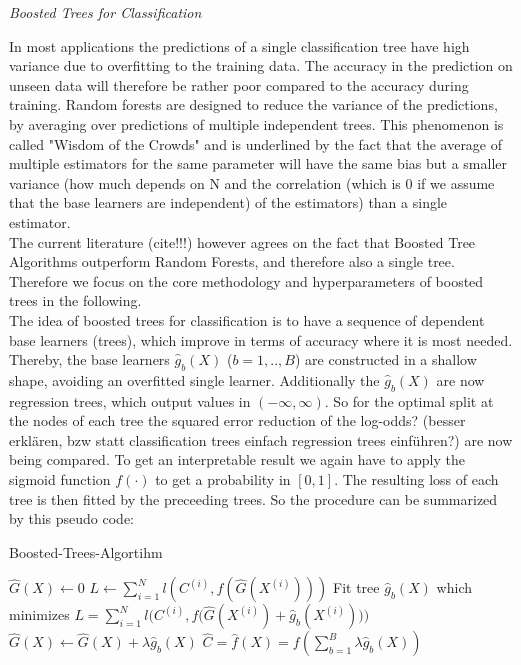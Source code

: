 \documentclass[12pt,titlepage]{article}
\begin{document}
\textit{Boosted Trees for Classification}

In most applications the predictions of a single classification tree have high variance due to overfitting to the training data. The accuracy in the prediction on unseen data will therefore be rather poor compared to the accuracy during training. Random forests \cite{randomforest} are designed to reduce the variance of the predictions, by averaging over predictions of multiple independent trees. This phenomenon is called "Wisdom of the Crowds" and is underlined by the fact that the average of multiple estimators for the same parameter will have the same bias but a smaller variance (how much depends on N and the correlation (which is 0 if we assume that the base learners are independent) of the estimators) than a single estimator. \\
The current literature (cite!!!) however agrees on the fact that Boosted Tree Algorithms outperform Random Forests, and therefore also a single tree. Therefore we focus on the core methodology and hyperparameters of boosted trees in the following. \\
The idea of boosted trees for classification is to have a sequence of dependent base learners (trees), which improve in terms of accuracy where it is most needed. Thereby, the base learners $\hat{g}_{b}(X)$ ($b=1,..,B$) are constructed in a shallow shape, avoiding an overfitted single learner. Additionally the $\hat{g}_{b}(X)$ are now regression trees, which output values in $(-\infty, \infty)$. So for the optimal split at the nodes of each tree the squared error reduction of the log-odds? (besser erklären, bzw statt classification trees einfach regression trees einführen?) are now being compared. To get an interpretable result we again have to apply the sigmoid function $f(\cdot)$ to get a probability in $[0, 1]$. The resulting loss of each tree is then fitted by the preceeding trees. So the procedure can be summarized by this pseudo code: \\

\begin{algorithm}
\caption{Boosted-Trees-Algortihm}\label{alg:boostedtrees}
\begin{algorithmic}
    \State $\hat{G}(X) \gets 0$
    \State $L \gets \sum_{i=1}^{N} l(C^{(i)}, f(\hat{G}(X^{(i)})))$
        \State Fit tree $\hat{g}_{b}(X)$ which minimizes $L = \sum_{i=1}^{N} l\Big(C^{(i)}, f\big(\hat{G}(X^{(i)}) + \hat{g}_{b}(X^{(i)})\big)\Big)$
        \State $\hat{G}(X) \gets \hat{G}(X) + \lambda\hat{g}_{b}(X)$
    \EndFor
    \State $\hat{C} = \hat{f}(X) = f(\sum_{b=1}^{B}\lambda\hat{g}_{b}(X))$
\end{algorithmic}
\end{algorithm}
\end{document}
